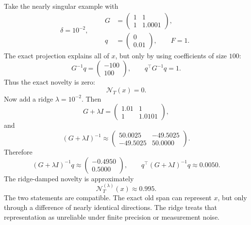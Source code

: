 \documentclass[10pt,twocolumn]{article}
\newcommand{\nov}{\mathcal N}
\begin{document}
Take the nearly singular example with
\begin{equation}
\delta=10^{-2},\qquad
\begin{aligned}
G&=\begin{pmatrix}1&1\\1&1.0001\end{pmatrix},\\
q&=\begin{pmatrix}0\\0.01\end{pmatrix},
\qquad F=1.
\end{aligned}
\end{equation}
The exact projection explains all of $x$, but only by using coefficients of size $100$:
\begin{equation}
G^{-1}q=\begin{pmatrix}-100\\100\end{pmatrix},
\qquad
q^\top G^{-1}q=1.
\end{equation}
Thus the exact novelty is zero:
\begin{equation}
\nov_T(x)=0.
\end{equation}
Now add a ridge $\lambda=10^{-2}$. Then
\begin{equation}
G+\lambda I
=
\begin{pmatrix}1.01&1\\1&1.0101\end{pmatrix},
\end{equation}
and
\begin{equation}
(G+\lambda I)^{-1}
\approx
\begin{pmatrix}
50.0025&-49.5025\\
-49.5025&50.0000
\end{pmatrix}.
\end{equation}
Therefore
\begin{equation}
(G+\lambda I)^{-1}q
\approx
\begin{pmatrix}-0.4950\\0.5000\end{pmatrix},
\qquad
q^\top(G+\lambda I)^{-1}q
\approx 0.0050.
\end{equation}
The ridge-damped novelty is approximately
\begin{equation}
\nov_T^{(\lambda)}(x)\approx0.995.
\end{equation}
The two statements are compatible. The exact old span can represent $x$, but only through a difference of nearly identical directions. The ridge treats that representation as unreliable under finite precision or measurement noise.
\end{document}
